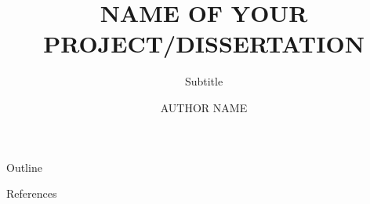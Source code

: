 \documentclass[aspectratio=169,11pt]{beamer}
\title{NAME OF YOUR PROJECT/DISSERTATION}
\subtitle{Subtitle}
\author{AUTHOR NAME}
\institute{University of Nottingham Ningbo China}
\begin{document}
\begin{frame}
  \titlepage
\end{frame}





\begin{frame}{Outline}
  \setlength{\parskip}{0.8em}
  \tableofcontents[hideallsubsections]
\end{frame}



\begin{frame}[allowframebreaks]{References}
  \scriptsize
  
  
\end{frame}

\appendix

\end{document}
